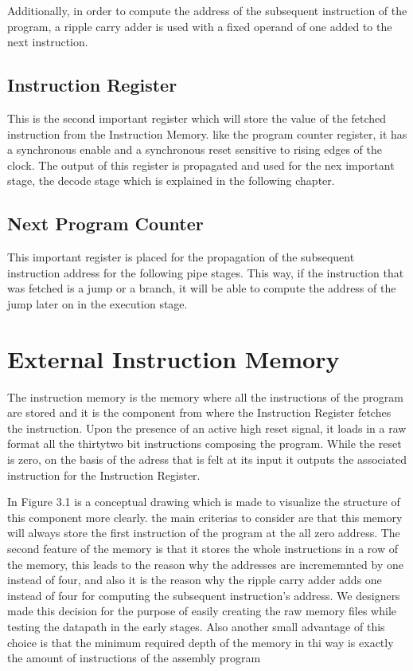 Additionally, in order to compute the address of the subsequent instruction of the program, a ripple carry adder is used with a fixed operand of one added
to the next instruction.

\subsection{ Instruction Register }

This is the second important register which will store the value of the fetched instruction from the Instruction Memory. like the program counter register,
it has a synchronous enable and a synchronous reset sensitive to rising edges of the clock. The output of this register is propagated and used for the nex important stage,
the decode stage which is explained in the following chapter. 

\subsection{ Next Program Counter }

This important register is placed for the propagation of the subsequent instruction address for the following pipe stages. This way, if the instruction
that was fetched is a jump or a branch, it will be able to compute the address of the jump later on in the execution stage.

\section{External Instruction Memory}

The instruction memory is the memory where all the instructions of the program are stored and it is the component from where the Instruction Register fetches the 
instruction. Upon the presence of an active high reset signal, it loads in a raw format all the thirtytwo bit instructions composing the program. While the reset is zero,
on the basis of the adress that is felt at its input it outputs the associated instruction for the Instruction Register.

In Figure 3.1 is a conceptual drawing which is made to visualize the structure of this component more clearly. the main criterias to consider are that this
memory will always store the first instruction of the program at the all zero address. The second feature of the memory is that it stores the whole instructions
in a row of the memory, this leads to the reason why the addresses are incrememnted by one instead of four, and also it is the reason why the
ripple carry adder adds one instead of four for computing the subsequent instruction's address. We designers made this decision for the purpose of easily creating the
raw memory files while testing the datapath in the early stages. Also another small advantage of this choice is that the minimum required depth of the memory in thi way is exactly the amount
of instructions of the assembly program

